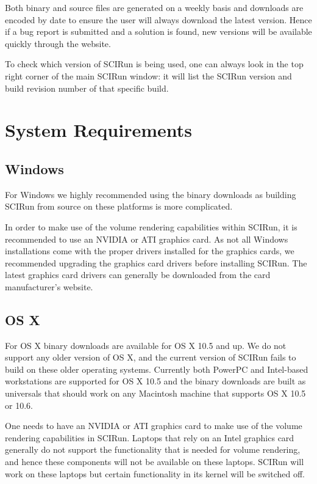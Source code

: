 \documentclass[fleqn,12pt,openany]{book}
\begin{document}
Both binary and source files are generated on a weekly basis and downloads are encoded by date to ensure
the user will always download the latest version.
Hence if a bug report is submitted and a solution is found, new versions will be available quickly through the website.

To check which version of SCIRun is being used, one can always look in the top right corner of the main SCIRun window:
it will list the SCIRun version and build revision number of that specific build. 

\section{System Requirements}

\subsection{Windows}

For Windows we highly recommended using the binary downloads as building SCIRun from source on these platforms is more complicated.

In order to make use of the volume rendering capabilities within SCIRun, it is recommended to use an NVIDIA or ATI graphics card.
As not all Windows installations come with the proper drivers installed for the graphics cards, we recommended upgrading the graphics card drivers before installing SCIRun.
The latest graphics card drivers can generally be downloaded from the card manufacturer's website.

\subsection{OS X}

For OS X binary downloads are available for OS X 10.5 and up.
We do not support any older version of OS X, and the current version of SCIRun fails to build on these older operating systems.
Currently both PowerPC and Intel-based workstations are supported for OS X 10.5 and the binary downloads are built as universals that should work on any Macintosh machine that supports OS X 10.5 or 10.6.

One needs to have an NVIDIA or ATI graphics card to make use of the volume rendering capabilities in SCIRun.
Laptops that rely on an Intel graphics card generally do not support the functionality that is needed for volume
rendering, and hence these components will not be available on these laptops.
SCIRun will work on these laptops but certain functionality in its kernel will be switched off. 
\end{document}

